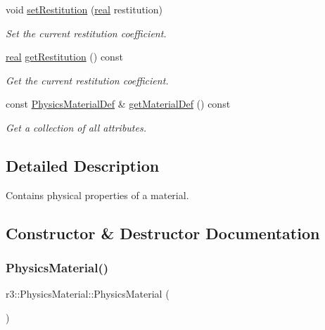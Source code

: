 \begin{DoxyCompactItemize}
void \mbox{\hyperlink{classr3_1_1_physics_material_a2056c195a2d655aefe9a480c28e67ddb}{set\+Restitution}} (\mbox{\hyperlink{namespacer3_ab2016b3e3f743fb735afce242f0dc1eb}{real}} restitution)
\begin{DoxyCompactList}\small\item\em Set the current restitution coefficient. \end{DoxyCompactList}\item 
\mbox{\hyperlink{namespacer3_ab2016b3e3f743fb735afce242f0dc1eb}{real}} \mbox{\hyperlink{classr3_1_1_physics_material_a555b73c2bde3679b0e40087455eab61e}{get\+Restitution}} () const
\begin{DoxyCompactList}\small\item\em Get the current restitution coefficient. \end{DoxyCompactList}\item 
const \mbox{\hyperlink{structr3_1_1_physics_material_def}{Physics\+Material\+Def}} \& \mbox{\hyperlink{classr3_1_1_physics_material_a652318d9fa4f6db099dc58d6f6ae314a}{get\+Material\+Def}} () const
\begin{DoxyCompactList}\small\item\em Get a collection of all attributes. \end{DoxyCompactList}\end{DoxyCompactItemize}


\subsection{Detailed Description}
Contains physical properties of a material. 

\subsection{Constructor \& Destructor Documentation}
\mbox{\label{classr3_1_1_physics_material_adf01a85845faf2303264617b4756946b}} 
\subsubsection{\texorpdfstring{Physics\+Material()}{PhysicsMaterial()}\hspace{0.1cm}{\footnotesize\ttfamily [1/2]}}
{\footnotesize\ttfamily r3\+::\+Physics\+Material\+::\+Physics\+Material (\begin{DoxyParamCaption}{ }\end{DoxyParamCaption})\hspace{0.3cm}{\ttfamily [explicit]}}

